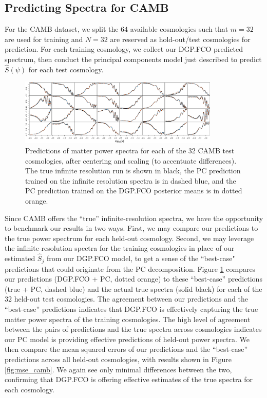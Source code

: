 \documentclass[11pt]{article}
\begin{document}
\subsection{Predicting Spectra for CAMB}
\label{subsec:camb_pred}

For the CAMB dataset, we split the 64 available cosmologies such that $m=32$
are used for training and $N=32$ are reserved as hold-out/test cosmologies for prediction. 
For each training cosmology, we collect our DGP.FCO predicted spectrum, then conduct the principal
components model just described to predict $\hat{S}(\psi)$ for each test cosmology.  

\begin{figure}
    \centering
    \includegraphics[width=0.85\textwidth]{pred_diffs_CAMB.jpeg}
    \caption{Predictions of matter power spectra for each of the 32 CAMB test cosmologies,
             after centering and scaling (to accentuate differences). 
             The true infinite resolution run is shown in black, the PC prediction 
             trained on the infinite resolution spectra is in dashed blue, and the PC prediction trained
             on the DGP.FCO posterior means is in dotted orange.}
    \label{fig:pca_preds_v_camb}
\end{figure}

Since CAMB offers the ``true'' infinite-resolution spectra, we have the opportunity to benchmark our
results in two ways.  First, we may compare our predictions to the true power spectrum for each held-out
cosmology.  Second, we may leverage the infinite-resolution spectra for the training cosmologies in
place of our estimated $\hat{S}_j$ from our DGP.FCO model, to get a sense of the ``best-case" predictions 
that could originate from the PC decomposition.  
Figure \ref{fig:pca_preds_v_camb} compares our predictions (DGP.FCO + PC, dotted orange)
to these ``best-case'' predictions (true + PC, dashed blue) and the actual true spectra (solid black)
for each of the 32 held-out test cosmologies.  
The agreement between our predictions and the ``best-case'' predictions indicates that DGP.FCO is effectively
capturing the true matter power spectra of the training cosmologies.
The high level of agreement between the pairs of predictions and the true spectra across cosmologies
indicates our PC model is providing effective predictions of held-out power spectra.
We then compare the mean squared errors of our predictions and the ``best-case'' 
predictions across all held-out cosmologies, with results shown in Figure \ref{fig:mse_camb}.  We again
see only minimal differences between the two, confirming that DGP.FCO is offering effective
estimates of the true spectra for each cosmology.
\end{document}
